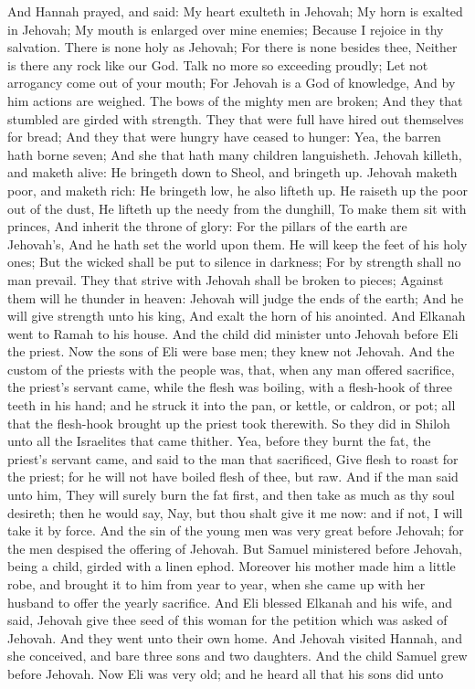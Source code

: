 And Hannah prayed, and said: My heart exulteth in Jehovah; My horn is exalted in Jehovah; My mouth is enlarged over mine enemies; Because I rejoice in thy salvation.  There is none holy as Jehovah; For there is none besides thee, Neither is there any rock like our God.  Talk no more so exceeding proudly; Let not arrogancy come out of your mouth; For Jehovah is a God of knowledge, And by him actions are weighed.  The bows of the mighty men are broken; And they that stumbled are girded with strength.  They that were full have hired out themselves for bread; And they that were hungry have ceased to hunger: Yea, the barren hath borne seven; And she that hath many children languisheth.  Jehovah killeth, and maketh alive: He bringeth down to Sheol, and bringeth up.  Jehovah maketh poor, and maketh rich: He bringeth low, he also lifteth up.  He raiseth up the poor out of the dust, He lifteth up the needy from the dunghill, To make them sit with princes, And inherit the throne of glory: For the pillars of the earth are Jehovah’s, And he hath set the world upon them.  He will keep the feet of his holy ones; But the wicked shall be put to silence in darkness; For by strength shall no man prevail.  They that strive with Jehovah shall be broken to pieces; Against them will he thunder in heaven: Jehovah will judge the ends of the earth; And he will give strength unto his king, And exalt the horn of his anointed.  And Elkanah went to Ramah to his house. And the child did minister unto Jehovah before Eli the priest.  Now the sons of Eli were base men; they knew not Jehovah. And the custom of the priests with the people was, that, when any man offered sacrifice, the priest’s servant came, while the flesh was boiling, with a flesh-hook of three teeth in his hand; and he struck it into the pan, or kettle, or caldron, or pot; all that the flesh-hook brought up the priest took therewith. So they did in Shiloh unto all the Israelites that came thither. Yea, before they burnt the fat, the priest’s servant came, and said to the man that sacrificed, Give flesh to roast for the priest; for he will not have boiled flesh of thee, but raw. And if the man said unto him, They will surely burn the fat first, and then take as much as thy soul desireth; then he would say, Nay, but thou shalt give it me now: and if not, I will take it by force. And the sin of the young men was very great before Jehovah; for the men despised the offering of Jehovah.  But Samuel ministered before Jehovah, being a child, girded with a linen ephod. Moreover his mother made him a little robe, and brought it to him from year to year, when she came up with her husband to offer the yearly sacrifice. And Eli blessed Elkanah and his wife, and said, Jehovah give thee seed of this woman for the petition which was asked of Jehovah. And they went unto their own home. And Jehovah visited Hannah, and she conceived, and bare three sons and two daughters. And the child Samuel grew before Jehovah.  Now Eli was very old; and he heard all that his sons did unto 